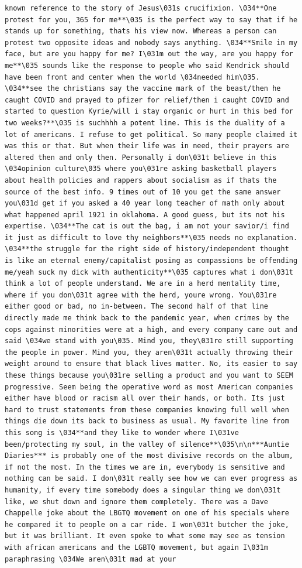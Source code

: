 \documentclass[
  letterpaper,
  DIV=11,
  numbers=noendperiod]{scrreprt}
\begin{document}
\begin{verbatim}
known reference to the story of Jesus\031s crucifixion. \034**One protest for you, 365 for me**\035 is the perfect way to say that if he stands up for something, thats his view now. Whereas a person can protest two opposite ideas and nobody says anything. \034**Smile in my face, but are you happy for me? I\031m out the way, are you happy for me**\035 sounds like the response to people who said Kendrick should have been front and center when the world \034needed him\035. \034**see the christians say the vaccine mark of the beast/then he caught COVID and prayed to pfizer for relief/then i caught COVID and started to question Kyrie/will i stay organic or hurt in this bed for two weeks?**\035 is suchhhh a potent line. This is the duality of a lot of americans. I refuse to get political. So many people claimed it was this or that. But when their life was in need, their prayers are altered then and only then. Personally i don\031t believe in this \034opinion culture\035 where you\031re asking basketball players about health policies and rappers about socialism as if thats the source of the best info. 9 times out of 10 you get the same answer you\031d get if you asked a 40 year long teacher of math only about what happened april 1921 in oklahoma. A good guess, but its not his expertise. \034**The cat is out the bag, i am not your savior/i find it just as difficult to love thy neighbors**\035 needs no explanation. \034**the struggle for the right side of history/independent thought is like an eternal enemy/capitalist posing as compassions be offending me/yeah suck my dick with authenticity**\035 captures what i don\031t think a lot of people understand. We are in a herd mentality time, where if you don\031t agree with the herd, youre wrong. You\031re either good or bad, no in-between. The second half of that line directly made me think back to the pandemic year, when crimes by the cops against minorities were at a high, and every company came out and said \034we stand with you\035. Mind you, they\031re still supporting the people in power. Mind you, they aren\031t actually throwing their weight around to ensure that black lives matter. No, its easier to say these things because you\031re selling a product and you want to SEEM progressive. Seem being the operative word as most American companies either have blood or racism all over their hands, or both. Its just hard to trust statements from these companies knowing full well when things die down its back to business as usual. My favorite line from this song is \034**and they like to wonder where I\031ve been/protecting my soul, in the valley of silence**\035\n\n***Auntie Diaries*** is probably one of the most divisive records on the album, if not the most. In the times we are in, everybody is sensitive and nothing can be said. I don\031t really see how we can ever progress as humanity, if every time somebody does a singular thing we don\031t like, we shut down and ignore them completely. There was a Dave Chappelle joke about the LBGTQ movement on one of his specials where he compared it to people on a car ride. I won\031t butcher the joke, but it was brilliant. It even spoke to what some may see as tension with african americans and the LGBTQ movement, but again I\031m paraphrasing \034We aren\031t mad at your 
\end{verbatim}
\end{document}
